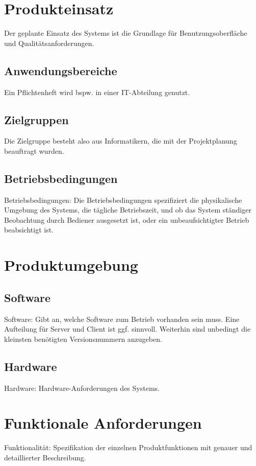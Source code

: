 \documentclass[a4paper]{scrreprt}
\begin{document}
    \chapter{Produkteinsatz}
        Der geplante Einsatz des Systems ist die Grundlage für Benutzungsoberfläche und
        Qualitätsanforderungen.
 
        \section{Anwendungsbereiche}
            Ein Pflichtenheft wird bspw. in einer IT-Abteilung genutzt.
 
        \section{Zielgruppen}
            Die Zielgruppe besteht also aus Informatikern, die mit der Projektplanung
            beauftragt wurden.
 
        \section{Betriebsbedingungen}
            Betriebsbedingungen: Die Betriebsbedingungen spezifiziert die physikalische
            Umgebung des Systems, die tägliche Betriebszeit, und ob das System ständiger
            Beobachtung durch Bediener ausgesetzt ist, oder ein unbeaufsichtigter Betrieb
            beabsichtigt ist.
 
    \chapter{Produktumgebung}
 
        \section{Software}
            Software: Gibt an, welche Software zum Betrieb vorhanden sein muss. Eine
            Aufteilung für Server und Client ist ggf. sinnvoll. Weiterhin sind unbedingt die
            kleinsten benötigten Versionsnummern anzugeben.
 
        \section{Hardware}
            Hardware: Hardware-Anforderungen des Systems.
 
    \chapter{Funktionale Anforderungen}
        Funktionalität: Spezifikation der einzelnen Produktfunktionen mit genauer und
        detaillierter Beschreibung.
 
\end{document}

